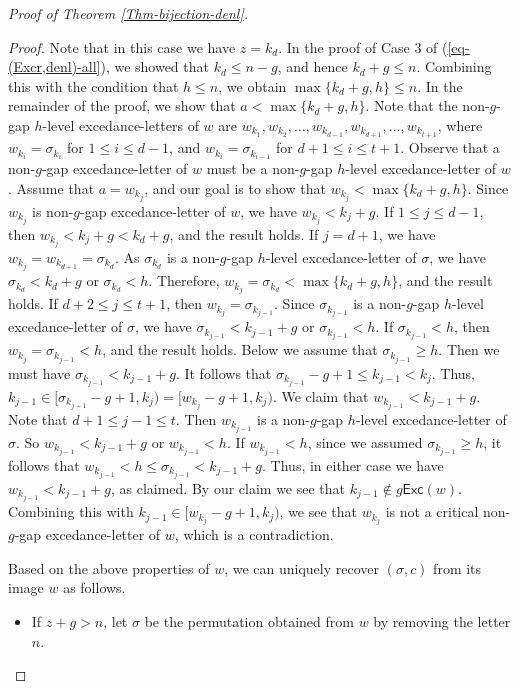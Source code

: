 \documentclass[12pt]{article}
\begin{document}
\begin{proof}[Proof of Theorem \ref{Thm-bijection-denl}]
\begin{itemize}
    \emph{Proof.} Note that in this case we have $z=k_{d}$.
	In the proof of Case 3 of (\ref{eq-(Excr,denl)-all}), 
	we showed that $k_{d}\leq n-g$, and hence $k_{d}+g\leq n$.
	Combining this with the condition that $h\leq n$, 
	we obtain $\max\{k_{d}+g,h\}\leq n$. 
    In the remainder of the proof, we show that $a<\max\{k_{d}+g,h\}$.
	Note that the non-$g$-gap $h$-level excedance-letters of $w$ are
	$w_{k_{1}},w_{k_{2}},\ldots,w_{k_{d-1}},w_{k_{d+1}},\ldots,w_{k_{t+1}}$,
	where $w_{k_{i}}=\sigma_{k_{i}}$ for $1\leq i\leq d-1$,
	and $w_{k_{i}}=\sigma_{k_{i-1}}$ for $d+1\leq i\leq t+1$.
	Observe that a non-$g$-gap excedance-letter of $w$ must be a non-$g$-gap $h$-level excedance-letter of $w$.
	Assume that $a=w_{k_{j}}$,
	and our goal is to show that $w_{k_{j}}<\max\{k_{d}+g,h\}$.
	Since $w_{k_{j}}$ is non-$g$-gap excedance-letter of $w$,
	we have $w_{k_{j}}<k_{j}+g$.
	If $1\leq j\leq d-1$,  
	then $w_{k_{j}}<k_{j}+g<k_{d}+g$, and the result holds.
	If $j=d+1$, we have $w_{k_{j}}=w_{k_{d+1}}=\sigma_{k_{d}}$.
	As $\sigma_{k_{d}}$ is a non-$g$-gap $h$-level excedance-letter of $\sigma$, 
	we have $\sigma_{k_{d}}<k_{d}+g$ or $\sigma_{k_{d}}<h$.
	Therefore, $w_{k_{j}}=\sigma_{k_{d}}<\max\{k_{d}+g,h\}$,
	and the result holds.
    If $d+2\leq j\leq t+1$,
	then $w_{k_{j}}=\sigma_{k_{j-1}}$.
	Since $\sigma_{k_{j-1}}$ is a non-$g$-gap $h$-level excedance-letter of $\sigma$, we have
    $\sigma_{k_{j-1}}<k_{j-1}+g$ or $\sigma_{k_{j-1}}<h$.
    If $\sigma_{k_{j-1}}<h$, then $w_{k_{j}}=\sigma_{k_{j-1}}<h$,
    and the result holds.
    Below we assume that $\sigma_{k_{j-1}}\geq h$.
    Then we must have $\sigma_{k_{j-1}}<k_{j-1}+g$.
    It follows that $\sigma_{k_{j-1}}-g+1\leq k_{j-1}<k_{j}$.
    Thus, $k_{j-1}\in[\sigma_{k_{j-1}}-g+1,k_{j})=[w_{k_{j}}-g+1,k_{j})$.
    We claim that $w_{k_{j-1}}<k_{j-1}+g$.
    Note that $d+1\leq j-1\leq t$.
    Then $w_{k_{j-1}}$ is a non-$g$-gap $h$-level excedance-letter of $\sigma$.
    So $w_{k_{j-1}}<k_{j-1}+g$ or $w_{k_{j-1}}<h$.
    If $w_{k_{j-1}}<h$, 
    since we assumed $\sigma_{k_{j-1}}\geq h$,
    it follows that $w_{k_{j-1}}<h\leq \sigma_{k_{j-1}}<k_{j-1}+g$.
    Thus, in either case we have $w_{k_{j-1}}<k_{j-1}+g$,
    as claimed.
    By our claim we see that  $k_{j-1}\notin g\textsf{Exc}(w)$. 
    Combining this with $k_{j-1}\in[w_{k_{j}}-g+1,k_{j})$,
	we see that $w_{k_{j}}$ is not a critical non-$g$-gap excedance-letter of $w$, which is a contradiction.
\end{itemize}
Based on the above properties of $w$, 
we can uniquely recover $(\sigma,c)$ from its image $w$ as follows.
\begin{itemize}
	\item[$\bullet$]  If $z+g>n$,
	let $\sigma$ be the permutation obtained from $w$ by removing the letter $n$.
	

\end{itemize}
\end{proof}
\end{document}
